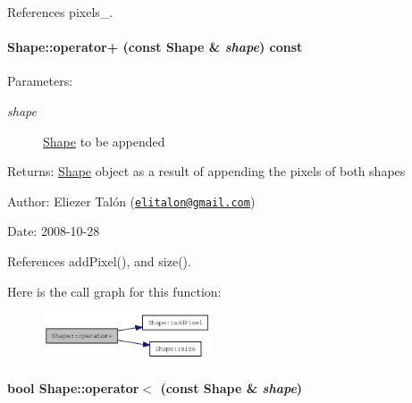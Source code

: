 References pixels\_\-.\hypertarget{class_shape_4e1517d6e14471df4750bc241f517b4e}{
\paragraph[{operator+}]{ Shape::operator+ (const {\bf Shape} \& {\em shape}) const}\hfill}
\label{class_shape_4e1517d6e14471df4750bc241f517b4e}


\begin{Desc}
\item[Parameters:]
\begin{description}
\item[{\em shape}]\hyperlink{class_shape}{Shape} to be appended\end{description}
\end{Desc}
\begin{Desc}
\item[Returns:]\hyperlink{class_shape}{Shape} object as a result of appending the pixels of both shapes\end{Desc}
\begin{Desc}
\item[Author:]Eliezer Talón (\href{mailto:elitalon@gmail.com}{\tt elitalon@gmail.com}) \end{Desc}
\begin{Desc}
\item[Date:]2008-10-28 \end{Desc}


References addPixel(), and size().

Here is the call graph for this function:\nopagebreak
\begin{figure}[H]
\begin{center}
\leavevmode
\includegraphics[width=141pt]{class_shape_4e1517d6e14471df4750bc241f517b4e_cgraph}
\end{center}
\end{figure}
\hypertarget{class_shape_183a6bc428172ced8122ffb68d0f04ef}{
\paragraph[{operator$<$}]{\setlength{\rightskip}{0pt plus 5cm}bool Shape::operator$<$ (const {\bf Shape} \& {\em shape})}\hfill}
\label{class_shape_183a6bc428172ced8122ffb68d0f04ef}


